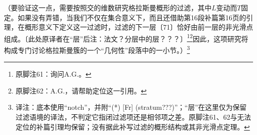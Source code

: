\documentclass[openany,fontset=fandol]{ctexbook}
\newcommand{\note}[1]{\footnote{译注：#1}}
\begin{document}
（要验证这一点，需要按照交的维数研究格拉斯曼概形的过滤，其中$L$变动而$T$固定。如果没有弄错，当我们不仅在集合意义下，而且还借助第16段补篇第16页的引理，在概形意义下定义这一过滤时，过滤的下一层〔71〕恰好由前一层的非光滑点组成。〔此处原译者在“层”后注：法文？分层中的层？？？〕\footnote{原脚注61：询问A.G.。}\footnote{原脚注62：A.G.，请帮助定位这一引用。}因此，这项研究将构成专门讨论格拉斯曼簇的一个“几何性”段落中的一小节。）\note{底本使用“notch”，并附“(*) [Fr] (stratum???)”；“层”在这里仅为保留过滤语境的译法，不判定它指闭过滤项还是相邻项之差。原脚注61、62与无法定位的补篇引理均保留；没有据此补写过滤的概形结构或其非光滑点定理。}
\end{document}
